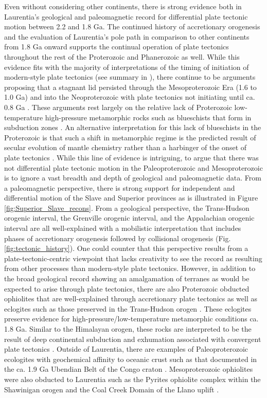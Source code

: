 \documentclass[twocolumn, switch]{article} %
\begin{document}
Even without considering other continents, there is strong evidence both in Laurentia's geological and paleomagnetic record for differential plate tectonic motion between 2.2 and 1.8 Ga. The continued history of accretionary orogenesis and the evaluation of Laurentia's pole path in comparison to other continents from 1.8 Ga onward supports the continual operation of plate tectonics throughout the rest of the Proterozoic and Phanerozoic as well. While this evidence fits with the majority of interpretations of the timing of initiation of modern-style plate tectonics (see summary in \citealp{Korenaga2013a}), there continue to be arguments proposing that a stagnant lid persisted through the Mesoproterozoic Era (1.6 to 1.0 Ga) and into the Neoproterozoic  with plate tectonics not initiating until ca. 0.8 Ga \citep{Hamilton2011a, Stern2018a}. These arguments rest largely on the relative lack of Proterozoic low-temperature high-pressure metamorphic rocks such as blueschists that form in subduction zones \citep{Stern2013a}. An alternative interpretation for this lack of blueschists in the Proterozoic is that such a shift in metamorphic regime is the predicted result of secular evolution of mantle chemistry rather than a harbinger of the onset of plate tectonics \citep{Palin2015a}. While this line of evidence is intriguing, to argue that there was not differential plate tectonic motion in the Paleoproterozoic and Mesoproterozoic is to ignore a vast breadth and depth of geological and paleomagnetic data. From a paleomagnetic perspective, there is strong support for independent and differential motion of the Slave and Superior provinces as is illustrated in Figure \ref{fig:Superior_Slave_recons}. From a geological perspective, the Trans-Hudson orogenic interval, the Grenville orogenic interval, and the Appalachian orogenic interval are all well-explained with a mobilistic interpretation that includes phases of accretionary orogenesis followed by collisional orogenesis (Fig. \ref{fig:tectonic_history}). One could counter that this perspective results from a plate-tectonic-centric viewpoint that lacks creativity to see the record as resulting from other processes than modern-style plate tectonics. However, in addition to the broad geological record showing an amalgamation of terranes as would be expected to arise through plate tectonics, there are also Proterozoic obducted ophiolites that are well-explained through accretionary plate tectonics as well as eclogites such as those preserved in the Trans-Hudson orogen \citep{Weller2017a}. These eclogites preserve evidence for high-pressure/low-temperature metamorphic conditions ca. 1.8 Ga. Similar to the Himalayan orogen, these rocks are interpreted to be the result of deep continental subduction and exhumation associated with convergent plate tectonics \citep{Weller2017a}. Outside of Laurentia, there are examples of Paleoproterozoic ecologites with geochemical affinity to oceanic crust such as that documented in the ca. 1.9 Ga Ubendian Belt of the Congo craton \citep{Boniface2012a}. Mesoproterozoic ophiolites were also obducted to Laurentia such as the Pyrites ophiolite complex within the Shawinigan orogen and the Coal Creek Domain of the Llano uplift \citep{Chiarenzelli2011a, McLelland2013a}.
\end{document}
